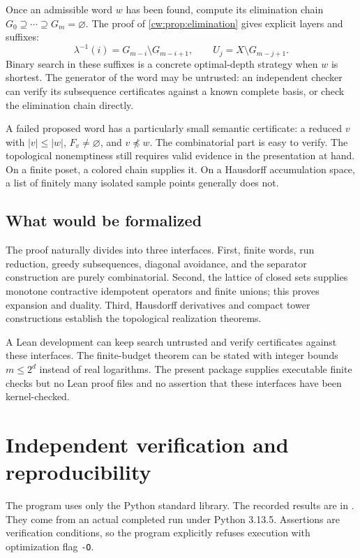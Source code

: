 \documentclass[11pt,letterpaper]{article}
\numberwithin{equation}{section}
\theoremstyle{definition}
\theoremstyle{remark}
\theoremstyle{definition}
\newcommand{\len}[1]{\lvert #1\rvert}
\begin{document}
Once an admissible word $w$ has been found, compute its elimination chain
$G_0\supseteq\cdots\supseteq G_m=\varnothing$.
The proof of \cref{cw:prop:elimination} gives explicit layers and suffixes:
\begin{equation}\label{cw:eq:questions}
 \lambda^{-1}(i)=G_{m-i}\setminus G_{m-i+1},\qquad
 U_j=X\setminus G_{m-j+1}.
\end{equation}
Binary search in these suffixes is a concrete optimal-depth strategy when
$w$ is shortest. The generator of the word may be untrusted: an independent
checker can verify its subsequence certificates against a known complete
basis, or check the elimination chain directly.

A failed proposed word has a particularly small semantic certificate:
a reduced $v$ with $\len v\le\len w$, $F_v\ne\varnothing$, and
$v\not\preceq w$. The combinatorial part is easy to verify. The topological
nonemptiness still requires valid evidence in the presentation at hand.
On a finite poset, a colored chain supplies it. On a Hausdorff accumulation
space, a list of finitely many isolated sample points generally does not.

\subsection{What would be formalized}

The proof naturally divides into three interfaces. First, finite words,
run reduction, greedy subsequences, diagonal avoidance, and the separator
construction are purely combinatorial. Second, the lattice of closed sets
supplies monotone contractive idempotent operators and finite unions; this
proves expansion and duality. Third, Hausdorff derivatives and compact tower
constructions establish the topological realization theorems.

A Lean development can keep search untrusted and verify certificates against
these interfaces. The finite-budget theorem can be stated with integer bounds
$m\le2^d$ instead of real logarithms. The present package supplies executable
finite checks but no Lean proof files and no assertion that these interfaces
have been kernel-checked.

\section{Independent verification and reproducibility}
\label{cw:sec:verification}

The program  uses only the Python
standard library. The recorded results are in
.
They come from an actual completed run under Python 3.13.5. Assertions are verification conditions,
so the program explicitly refuses execution with optimization flag
\texttt{-O}.
\end{document}
